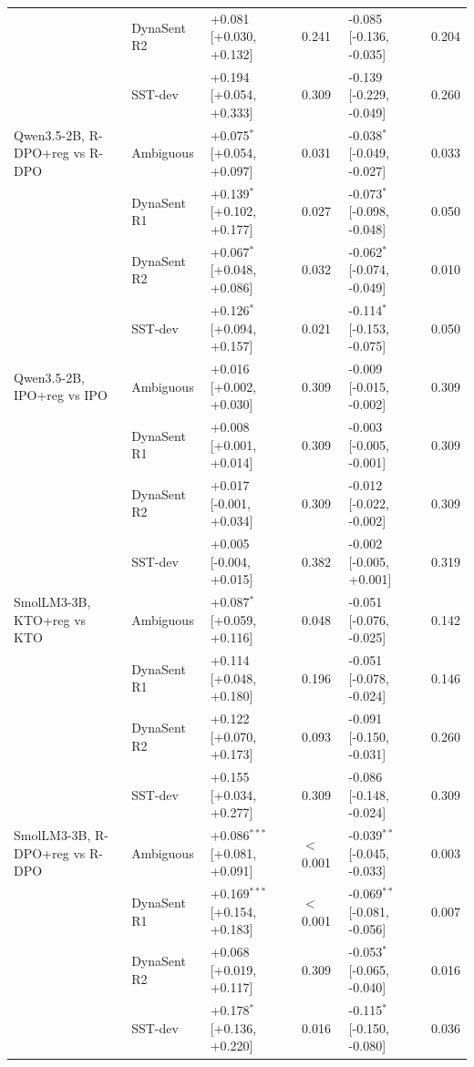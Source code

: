 \begin{table}[t]
\begin{tabular}{llllll}
 & DynaSent R2 & +0.081 [+0.030, +0.132] & 0.241 & -0.085 [-0.136, -0.035] & 0.204 \\
 & SST-dev & +0.194 [+0.054, +0.333] & 0.309 & -0.139 [-0.229, -0.049] & 0.260 \\
\addlinespace
Qwen3.5-2B, R-DPO+reg vs R-DPO & Ambiguous & +0.075$^{*}$ [+0.054, +0.097] & 0.031 & -0.038$^{*}$ [-0.049, -0.027] & 0.033 \\
 & DynaSent R1 & +0.139$^{*}$ [+0.102, +0.177] & 0.027 & -0.073$^{*}$ [-0.098, -0.048] & 0.050 \\
 & DynaSent R2 & +0.067$^{*}$ [+0.048, +0.086] & 0.032 & -0.062$^{*}$ [-0.074, -0.049] & 0.010 \\
 & SST-dev & +0.126$^{*}$ [+0.094, +0.157] & 0.021 & -0.114$^{*}$ [-0.153, -0.075] & 0.050 \\
\addlinespace
Qwen3.5-2B, IPO+reg vs IPO & Ambiguous & +0.016 [+0.002, +0.030] & 0.309 & -0.009 [-0.015, -0.002] & 0.309 \\
 & DynaSent R1 & +0.008 [+0.001, +0.014] & 0.309 & -0.003 [-0.005, -0.001] & 0.309 \\
 & DynaSent R2 & +0.017 [-0.001, +0.034] & 0.309 & -0.012 [-0.022, -0.002] & 0.309 \\
 & SST-dev & +0.005 [-0.004, +0.015] & 0.382 & -0.002 [-0.005, +0.001] & 0.319 \\
\addlinespace
SmolLM3-3B, KTO+reg vs KTO & Ambiguous & +0.087$^{*}$ [+0.059, +0.116] & 0.048 & -0.051 [-0.076, -0.025] & 0.142 \\
 & DynaSent R1 & +0.114 [+0.048, +0.180] & 0.196 & -0.051 [-0.078, -0.024] & 0.146 \\
 & DynaSent R2 & +0.122 [+0.070, +0.173] & 0.093 & -0.091 [-0.150, -0.031] & 0.260 \\
 & SST-dev & +0.155 [+0.034, +0.277] & 0.309 & -0.086 [-0.148, -0.024] & 0.309 \\
\addlinespace
SmolLM3-3B, R-DPO+reg vs R-DPO & Ambiguous & +0.086$^{***}$ [+0.081, +0.091] & $<$0.001 & -0.039$^{**}$ [-0.045, -0.033] & 0.003 \\
 & DynaSent R1 & +0.169$^{***}$ [+0.154, +0.183] & $<$0.001 & -0.069$^{**}$ [-0.081, -0.056] & 0.007 \\
 & DynaSent R2 & +0.068 [+0.019, +0.117] & 0.309 & -0.053$^{*}$ [-0.065, -0.040] & 0.016 \\
 & SST-dev & +0.178$^{*}$ [+0.136, +0.220] & 0.016 & -0.115$^{*}$ [-0.150, -0.080] & 0.036 \\
\bottomrule
\end{tabular}
\end{table}
